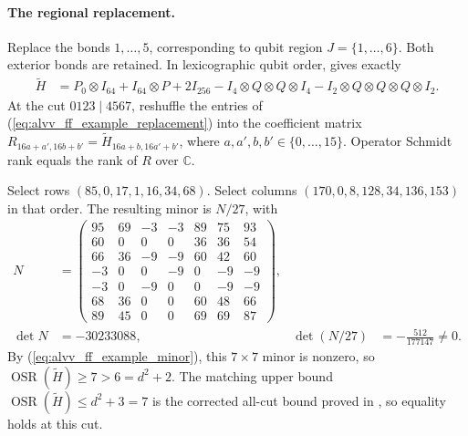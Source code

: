 \documentclass{article}
\begin{document}
\paragraph{The regional replacement.}
Replace the bonds $1,\ldots,5$, corresponding to qubit region
$J=\{1,\ldots,6\}$. Both exterior bonds are retained. In lexicographic
qubit order, \cite[Definition~5.10]{Arad2016RigorousRG} gives exactly
\begin{align}
    \widetilde H
     & =P_0\otimes I_{64}+I_{64}\otimes P+2I_{256}
    -I_4\otimes Q\otimes Q\otimes I_4
    -I_2\otimes Q\otimes Q\otimes Q\otimes I_2.
    \label{eq:alvv_ff_example_replacement}
\end{align}
At the cut $0123\mid4567$, reshuffle the entries of
(\ref{eq:alvv_ff_example_replacement}) into the coefficient
matrix $R_{16a+a',16b+b'}=\widetilde H_{16a+b,16a'+b'}$,
where $a,a',b,b'\in\{0,\ldots,15\}$.
Operator Schmidt rank equals the rank of $R$ over $\mathbb C$.

Select rows $(85,0,17,1,16,34,68)$.
Select columns $(170,0,8,128,34,136,153)$ in that order.
The resulting minor is $N/27$, with
\begin{align}
    N          & =\begin{pmatrix}
                      95 & 69 & -3 & -3 & 89 & 75 & 93 \\
                      60 & 0  & 0  & 0  & 36 & 36 & 54 \\
                      66 & 36 & -9 & -9 & 60 & 42 & 60 \\
                      -3 & 0  & 0  & -9 & 0  & -9 & -9 \\
                      -3 & 0  & -9 & 0  & 0  & -9 & -9 \\
                      68 & 36 & 0  & 0  & 60 & 48 & 66 \\
                      89 & 45 & 0  & 0  & 69 & 69 & 87
                  \end{pmatrix},     \\
    \det N     & =-30233088,                         &
    \det(N/27) & =-\frac{512}{177147}\ne0.
    \label{eq:alvv_ff_example_minor}
\end{align}
By (\ref{eq:alvv_ff_example_minor}), this $7\times7$ minor is nonzero, so
$\operatorname{OSR}(\widetilde H)\ge7>6=d^2+2$.
The matching upper bound $\operatorname{OSR}(\widetilde H)\le d^2+3=7$ is the
corrected all-cut bound proved in
,
so equality holds at this cut.
\end{document}
